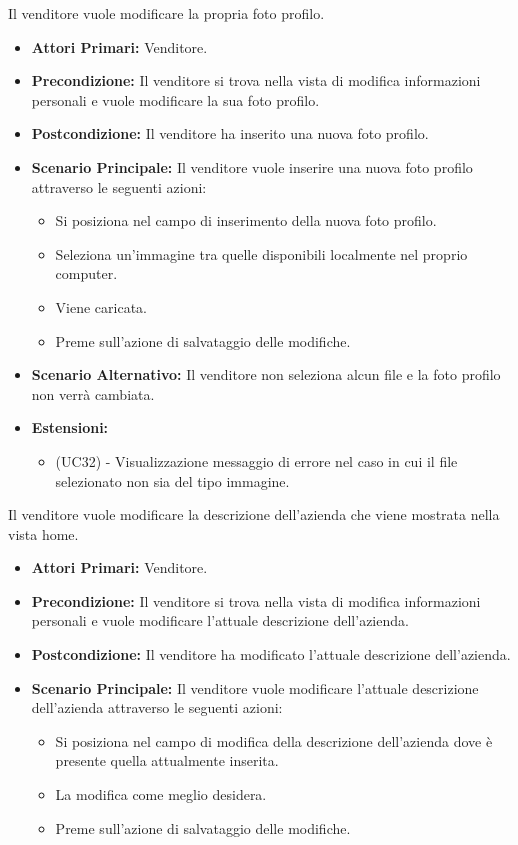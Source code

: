 Il venditore vuole modificare la propria foto profilo.
\begin{itemize}
    \item \textbf{Attori Primari:} Venditore.
    \item \textbf{Precondizione:} Il venditore si trova nella vista di modifica informazioni personali e vuole modificare la sua foto profilo.
    \item \textbf{Postcondizione:} Il venditore ha inserito una nuova foto profilo.
    \item \textbf{Scenario Principale:} Il venditore vuole inserire una nuova foto profilo attraverso le seguenti azioni:
    \begin{itemize}
        \item Si posiziona nel campo di inserimento della nuova foto profilo.
        \item Seleziona un'immagine tra quelle disponibili localmente nel proprio computer.
        \item Viene caricata.
        \item Preme sull'azione di salvataggio delle modifiche.
    \end{itemize}
    \item \textbf{Scenario Alternativo:} Il venditore non seleziona alcun file e la foto profilo non verrà cambiata.
    \item \textbf{Estensioni:}
    \begin{itemize}
        \item (UC32) - Visualizzazione messaggio di errore nel caso in cui il file selezionato non sia del tipo immagine.
    \end{itemize}
\end{itemize}

Il venditore vuole modificare la descrizione dell'azienda che viene mostrata nella vista home.
\begin{itemize}
    \item \textbf{Attori Primari:} Venditore.
    \item \textbf{Precondizione:} Il venditore si trova nella vista di modifica informazioni personali e vuole modificare l'attuale descrizione dell'azienda.
    \item \textbf{Postcondizione:} Il venditore ha modificato l'attuale descrizione dell'azienda.
    \item \textbf{Scenario Principale:} Il venditore vuole modificare l'attuale descrizione dell'azienda attraverso le seguenti azioni:
    \begin{itemize}
        \item Si posiziona nel campo di modifica della descrizione dell'azienda dove è presente quella attualmente inserita.
        \item La modifica come meglio desidera.
        \item Preme sull'azione di salvataggio delle modifiche.
    \end{itemize}
\end{itemize}

